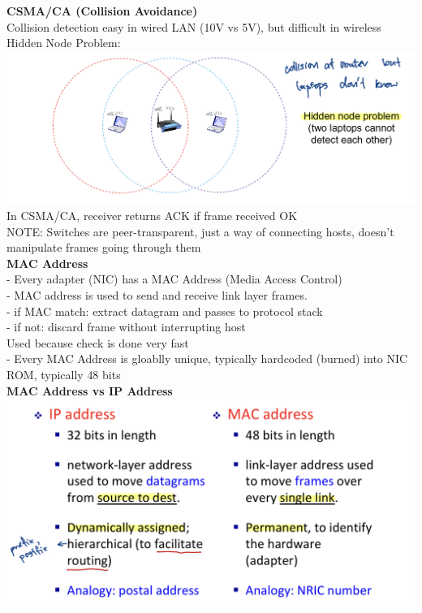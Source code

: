\documentclass[10pt, a4paper]{article}
\newcommand{\blue}[1]{{\color{MidnightBlue}#1}}
\newcommand{\red}[1]{{\color{red}#1}}
\newcommand{\tab}[0]{\hspace*{2mm}}
\begin{document}
\begin{multicols*}{3}
		\textbf{CSMA/CA (Collision Avoidance)}\\
		Collision detection easy in wired LAN (10V vs 5V), but difficult in wireless\\
		Hidden Node Problem:\\
		\includegraphics[scale=.15]{./assets/hiddenNode}\\
		In CSMA/CA, receiver returns ACK if frame received OK\\
		\red{NOTE: }Switches are \blue{peer-transparent}, just a way of connecting hosts, doesn't manipulate frames going through them\\

		\textbf{MAC Address}\\
		- Every adapter (NIC) has a \blue{MAC Address} (Media Access Control)\\
		- MAC address is used to send and receive link layer frames.\\
		\tab - if MAC match: extract datagram and passes to protocol stack\\
		\tab - if not: discard frame without interrupting host\\
		Used because check is done very fast\\

		- Every MAC Address is \blue{gloablly unique}, typically \blue{hardcoded (burned)} into NIC ROM, typically \blue{48 bits}\\

		\textbf{MAC Address vs IP Address}\\
		\includegraphics[scale=.13]{./assets/macVsIp}\\


\end{multicols*}
\end{document}
